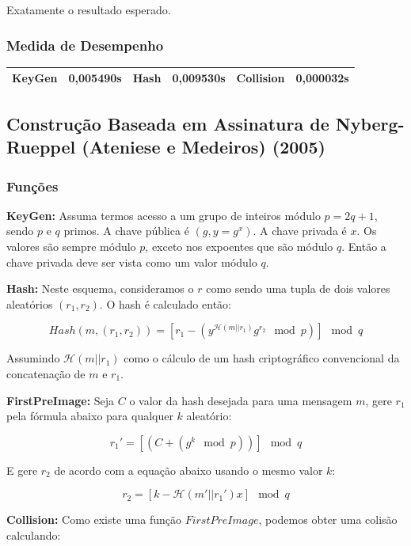 \documentclass[a4paper]{article}
\begin{document}
Exatamente o resultado esperado.

\subsubsection{Medida de Desempenho}

\begin{center}
\begin{tabular}{|c|c|c|c|c|c|}
  \hline
  KeyGen & 0,005490s & Hash & 0,009530s & Collision & 0,000032s\\
  \hline
\end{tabular}
\end{center}

\subsection{Construção Baseada em Assinatura de Nyberg-Rueppel (Ateniese e Medeiros) (2005)\cite{ateniese}}

\subsubsection{Funções}

\textbf{KeyGen: }Assuma termos acesso a um grupo de inteiros módulo
$p=2q+1$, sendo $p$ e $q$ primos. A chave pública é $(g, y=g^x)$. A
chave privada é $x$. Os valores são sempre módulo $p$, exceto nos
expoentes que são módulo $q$. Então a chave privada deve ser vista
como um valor módulo $q$.

\textbf{Hash: }Neste esquema, consideramos o $r$ como sendo uma tupla
de dois valores aleatórios $(r_1, r_2)$. O hash é calculado então:

$$ Hash(m, (r_1, r_2)) = \left[r_1-(y^{\mathcal{H}(m||r_1)}g^{r_2}
  \mod p)\right] \mod q
$$

Assumindo $\mathcal{H}(m||r_1)$ como o cálculo de um hash
criptográfico convencional da concatenação de $m$ e $r_1$.

\textbf{FirstPreImage:} Seja $C$ o valor da hash desejada para uma
mensagem $m$, gere $r_1$ pela fórmula abaixo para qualquer $k$
aleatório:

$$
r_1' = \left[(C + (g^k \mod p))\right] \mod q
$$

E gere $r_2$ de acordo com a equação abaixo usando o mesmo valor $k$:

$$
r_2 = \left[k-\mathcal{H}(m'||r_1')x\right] \mod q
$$

\textbf{Collision:} Como existe uma função $FirstPreImage$, podemos
obter uma colisão calculando:
\end{document}
